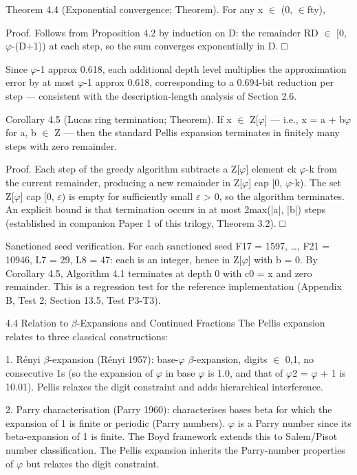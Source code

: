         Theorem 4.4 (Exponential convergence; Theorem). For any x $\in$ (0, $\in$fty),

        Proof. Follows from Proposition 4.2 by induction on D: the remainder RD $\in$ [0,
        $\varphi$-(D+1)) at each step, so the sum converges exponentially in D. □

  Since $\varphi$-1 approx 0.618, each additional depth level multiplies the approximation error
  by at most $\varphi$-1 approx 0.618, corresponding to a 0.694-bit reduction per step ---
  consistent with the description-length analysis of Section 2.6.

        Corollary 4.5 (Lucas ring termination; Theorem). If x $\in$ Z[$\varphi$] --- i.e., x = a +
        b$\varphi$ for a, b $\in$ Z --- then the standard Pellis expansion terminates in finitely many
        steps with zero remainder.

        Proof. Each step of the greedy algorithm subtracts a Z[$\varphi$] element ck $\varphi$-k from the
        current remainder, producing a new remainder in Z[$\varphi$] cap [0, $\varphi$-k). The set Z[$\varphi$]
        cap [0, $\varepsilon$) is empty for sufficiently small $\varepsilon$ > 0, so the algorithm terminates. An
        explicit bound is that termination occurs in at most 2max(|a|, |b|) steps
        (established in companion Paper 1 of this trilogy, Theorem 3.2). □

  Sanctioned seed verification. For each sanctioned seed F17 = 1597, …, F21 = 10946,
  L7 = 29, L8 = 47: each is an integer, hence in Z[$\varphi$] with b = 0. By Corollary 4.5,
  Algorithm 4.1 terminates at depth 0 with c0 = x and zero remainder. This is a
  regression test for the reference implementation (Appendix B, Test 2; Section 13.5, Test
  P3-T3).

  4.4 Relation to $\beta$-Expansions and Continued Fractions
  The Pellis expansion relates to three classical constructions:

  1. Rényi $\beta$-expansion (Rényi 1957): base-$\varphi$ $\beta$-expansion, digits $\in$ {0,1}, no consecutive
  1s (so the expansion of $\varphi$ in base $\varphi$ is 1.0, and that of $\varphi$2 = $\varphi$ + 1 is 10.01). Pellis relaxes
  the digit constraint and adds hierarchical interference.

  2. Parry characterisation (Parry 1960): characterises bases beta for which the
  expansion of 1 is finite or periodic (Parry numbers). $\varphi$ is a Parry number since its
  beta-expansion of 1 is finite. The Boyd framework extends this to Salem/Pisot number
  classification. The Pellis expansion inherits the Parry-number properties of $\varphi$ but
  relaxes the digit constraint.

